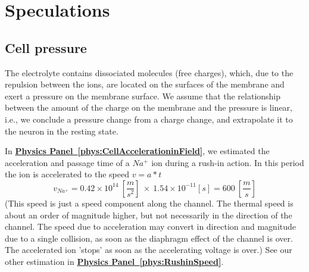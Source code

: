 

\chapter{Speculations\label{ch:Speculations}}

\iflatexml
\else
\minitoc
\fi

\section{Cell pressure\label{sec:CellPressure}}
The electrolyte contains dissociated molecules (free charges),
which, due to the repulsion between the ions, are located 
on the surfaces of the membrane and exert a pressure on the membrane surface.
We assume that the relationship between the amount of the charge on the membrane
and the pressure is linear, i.e., we conclude a pressure change from a charge change, and extrapolate it to the neuron in the resting state. 


{

In \textbf{\hyperlink{phys:CellAccelerationinField}{Physics Panel~\ref{phys:CellAccelerationinField}}},
we estimated the acceleration and passage time of a $Na^+$ 
ion during a rush-in action.
In this period the ion is accelerated to the speed  $v=a*t$
\begin{equation}
v_{Na^+} = 0.42 \times 10^{14}\ [\frac{m}{s^{2}}]\ \times\ 1.54\times 10^{-11}  [s] = 600\ [\frac{m}{s}]
\end{equation}
(This speed is just a speed component along the channel. The thermal speed is about an order of magnitude higher, but not necessarily in the direction of the channel. The speed due to acceleration may convert in direction and magnitude due to a single collision, as soon as the diaphragm effect of the channel is over. The accelerated ion 'stops' as soon as
the accelerating voltage is over.)
See our other estimation in   
\textbf{\hyperlink{phys:RushinSpeed}{Physics Panel~\ref{phys:RushinSpeed}}}.
}

